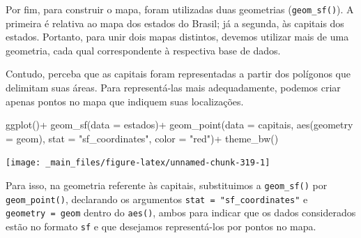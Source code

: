 \documentclass[
  brazilian,
]{book}
\newenvironment{Shaded}{\begin{snugshade}}{\end{snugshade}}
\newcommand{\AttributeTok}[1]{\textcolor[rgb]{0.77,0.63,0.00}{#1}}
\newcommand{\FunctionTok}[1]{\textcolor[rgb]{0.00,0.00,0.00}{#1}}
\newcommand{\NormalTok}[1]{#1}
\newcommand{\SpecialCharTok}[1]{\textcolor[rgb]{0.00,0.00,0.00}{#1}}
\newcommand{\StringTok}[1]{\textcolor[rgb]{0.31,0.60,0.02}{#1}}
\begin{document}
Por fim, para construir o mapa, foram utilizadas duas geometrias (\texttt{geom\_sf()}). A primeira é relativa ao mapa dos estados do Brasil; já a segunda, às capitais dos estados. Portanto, para unir dois mapas distintos, devemos utilizar mais de uma geometria, cada qual correspondente à respectiva base de dados.

Contudo, perceba que as capitais foram representadas a partir dos polígonos que delimitam suas áreas. Para representá-las mais adequadamente, podemos criar apenas pontos no mapa que indiquem suas localizações.

\begin{Shaded}
\begin{Highlighting}[]
\FunctionTok{ggplot}\NormalTok{()}\SpecialCharTok{+}
  \FunctionTok{geom\_sf}\NormalTok{(}\AttributeTok{data =}\NormalTok{ estados)}\SpecialCharTok{+}
  \FunctionTok{geom\_point}\NormalTok{(}\AttributeTok{data =}\NormalTok{ capitais,}
             \FunctionTok{aes}\NormalTok{(}\AttributeTok{geometry =}\NormalTok{ geom),}
             \AttributeTok{stat =} \StringTok{"sf\_coordinates"}\NormalTok{,}
             \AttributeTok{color =} \StringTok{"red"}\NormalTok{)}\SpecialCharTok{+}
  \FunctionTok{theme\_bw}\NormalTok{()}
\end{Highlighting}
\end{Shaded}

\begin{center}\texttt{[image: \_main\_files/figure-latex/unnamed-chunk-319-1]} \end{center}

Para isso, na geometria referente às capitais, substituimos a \texttt{geom\_sf()} por \texttt{geom\_point()}, declarando os argumentos \texttt{stat\ =\ "sf\_coordinates"} e \texttt{geometry\ =\ geom} dentro do \texttt{aes()}, ambos para indicar que os dados considerados estão no formato \texttt{sf} e que desejamos representá-los por pontos no mapa.
\end{document}
